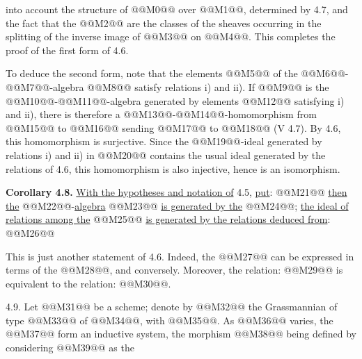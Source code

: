 into account the structure of @@M0@@ over @@M1@@, determined by 4.7, and the fact that the @@M2@@ are the classes of the sheaves occurring in the splitting of the inverse image of @@M3@@ on @@M4@@. This completes the proof of the first form of 4.6.

To deduce the second form, note that the elements @@M5@@ of the @@M6@@-@@M7@@-algebra @@M8@@ satisfy relations i) and ii). If @@M9@@ is the @@M10@@-@@M11@@-algebra generated by elements @@M12@@ satisfying i) and ii), there is therefore a @@M13@@-@@M14@@-homomorphism from @@M15@@ to @@M16@@ sending @@M17@@ to @@M18@@ (V 4.7). By 4.6, this homomorphism is surjective. Since the @@M19@@-ideal generated by relations i) and ii) in @@M20@@ contains the usual ideal generated by the relations of 4.6, this homomorphism is also injective, hence is an isomorphism.

\textbf{Corollary 4.8.} \uline{With the hypotheses and notation of} 4.5, \uline{put}:
@@M21@@
\uline{then the} @@M22@@-\uline{algebra} @@M23@@ \uline{is generated by the} @@M24@@; \uline{the ideal of relations among the} @@M25@@ \uline{is generated by the relations deduced from}:
@@M26@@

This is just another statement of 4.6. Indeed, the @@M27@@ can be expressed in terms of the @@M28@@, and conversely. Moreover, the relation: @@M29@@ is equivalent to the relation: @@M30@@.

4.9.
Let @@M31@@ be a scheme; denote by @@M32@@ the Grassmannian of type @@M33@@ of @@M34@@, with @@M35@@. As @@M36@@ varies, the @@M37@@ form an inductive system, the morphism @@M38@@ being defined by considering @@M39@@ as the
